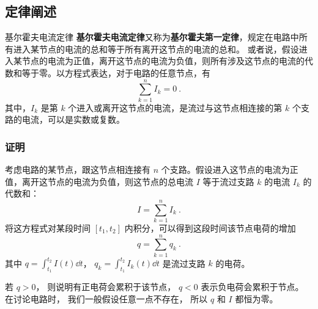 

\subsection{定律阐述}
\begin{theorem}{基尔霍夫电流定律}
\textbf{基尔霍夫电流定律}又称为\textbf{基尔霍夫第一定律}，规定在电路中所有进入某节点的电流的总和等于所有离开这节点的电流的总和。 或者说，假设进入某节点的电流为正值，离开这节点的电流为负值，则所有涉及这节点的电流的代数和等于零。以方程式表达，对于电路的任意节点，有
\begin{equation}
\sum_{k=1}^n I_k =0~.
\end{equation}
其中，$I_k$ 是第 $k$ 个进入或离开这节点的电流，是流过与这节点相连接的第 $k$ 个支路的电流，可以是实数或复数。
\end{theorem}

\subsubsection{证明}
考虑电路的某节点，跟这节点相连接有 $n$ 个支路。假设进入这节点的电流为正值，离开这节点的电流为负值，则这节点的总电流 $I$ 等于流过支路 $k$ 的电流 $I_k$ 的代数和：
\begin{equation}
I=\sum_{k=1}^n I_k~.
\end{equation}
将这方程式对某段时间 $[t_1, t_2]$ 内积分，可以得到这段时间该节点电荷的增加
\begin{equation}
q=\sum_{k=1}^n q_k~.
\end{equation}
其中 $q = \int_{t_1}^{t_2} I(t) \dd{t}$， $q_k=\int_{t_1}^{t_2} I_k(t) \dd{t}$ 是流过支路 $k$ 的电荷。

若 $q>0$， 则说明有正电荷会累积于该节点， $q < 0$ 表示负电荷会累积于节点。 在讨论电路时， 我们一般假设任意一点不存在， 所以 $q$ 和 $I$ 都恒为零。

